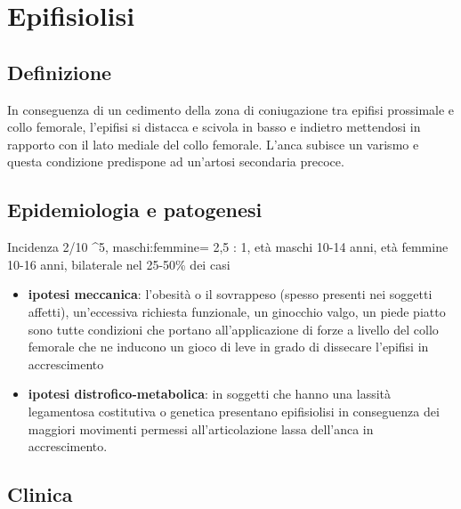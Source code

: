 \section{Epifisiolisi}

\subsection{Definizione}
In conseguenza di un cedimento della zona di
coniugazione tra epifisi prossimale e collo femorale, l'epifisi si distacca e scivola in basso e indietro mettendosi in rapporto con il lato mediale del collo femorale. L'anca subisce un varismo e questa condizione predispone ad un'artosi secondaria precoce.

\subsection{Epidemiologia e patogenesi}

Incidenza 2/10 \^{}5, maschi:femmine= 2,5 : 1, età maschi 10-14 anni, età femmine 10-16 anni, bilaterale nel 25-50\% dei casi

\begin{itemize}
\item
  \textbf{ipotesi meccanica}: l'obesità o il sovrappeso (spesso presenti nei soggetti affetti), un'eccessiva richiesta funzionale, un ginocchio valgo, un piede piatto sono tutte condizioni che portano all'applicazione di forze a livello del collo femorale che ne inducono un gioco di leve in grado di dissecare l'epifisi in accrescimento
\item
  \textbf{ipotesi distrofico-metabolica}: in soggetti che hanno una lassità legamentosa costitutiva o genetica presentano epifisiolisi in conseguenza dei maggiori movimenti permessi all'articolazione lassa dell'anca in accrescimento.
\end{itemize}

\subsection{Clinica}

